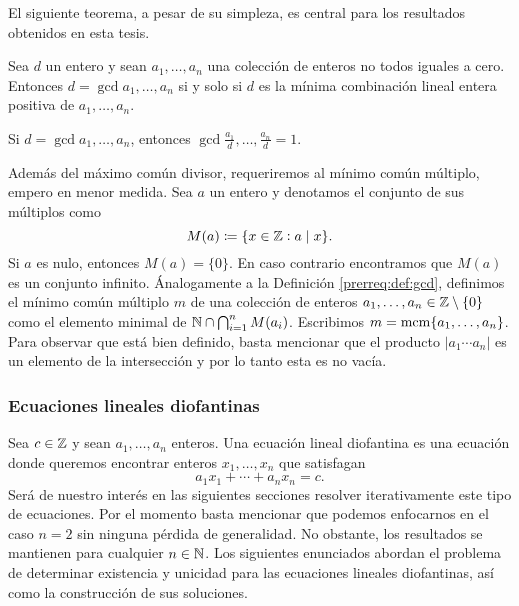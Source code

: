 El siguiente teorema, a pesar de su simpleza, es central para los resultados obtenidos en esta
tesis.
\begin{theorem}
	\label{prerreq:th:bezout}
	Sea $d$ un entero y sean $a_1, \ldots, a_n$ una colección de enteros no todos iguales a cero.
	Entonces $d = \gcd{a_1, \ldots, a_n}$ si y solo si $d$ es la mínima combinación lineal entera
	positiva de $a_1, \ldots, a_n$.
\end{theorem}


\begin{corollary}
	\label{prerreq:cor:gcd}
	Si $d = \gcd{a_1, \ldots, a_n}$, entonces $\gcd{\frac{a_1}{d}, \ldots, \frac{a_n}{d}} = 1$.
\end{corollary}

Además del máximo común divisor, requeriremos al mínimo común múltiplo, empero en menor medida. Sea
$a$ un entero y denotamos el conjunto de sus múltiplos como
\begin{equation*}
	M(a) \coloneq \lbrace x \in \mathbb{Z} \vcentcolon a \mid x \rbrace.
\end{equation*}
Si $a$ es nulo, entonces $M(a) = \lbrace 0 \rbrace$. En caso contrario encontramos que $M(a)$ es un
conjunto infinito. Ánalogamente a la Definición \ref{prerreq:def:gcd}, definimos el mínimo común
múltiplo $m$ de una colección de enteros $a_1, \ldots, a_n \in \mathbb{Z} \setminus \lbrace 0 \rbrace$ como
el elemento minimal de $\mathbb{N} \cap \bigcap_{i=1}^{n}M(a_i)$. Escribimos $m = \mathop{\mathrm{mcm}{\left\lbrace a_1, \ldots, a_n \right\rbrace}}$.
Para observar que está bien definido, basta mencionar que el producto $|a_1 \cdots a_n|$ es un
elemento de la intersección y por lo tanto esta es no vacía.

\subsubsection{Ecuaciones lineales diofantinas}

\noindent
Sea $c \in \mathbb{Z}$ y sean $a_1, \ldots, a_n$ enteros. Una ecuación lineal diofantina es una ecuación
donde queremos encontrar enteros $x_1, \ldots, x_n$ que satisfagan
\begin{equation*}
	a_1x_1 + \cdots + a_nx_n = c.
\end{equation*}
Será de nuestro interés en las siguientes secciones resolver iterativamente este tipo de ecuaciones.
Por el momento basta mencionar que podemos enfocarnos en el caso $n = 2$ sin ninguna pérdida de
generalidad. No obstante, los resultados se mantienen para cualquier $n \in \mathbb{N}$. Los siguientes
enunciados abordan el problema de determinar existencia y unicidad para las ecuaciones lineales
diofantinas, así como la construcción de sus soluciones.

